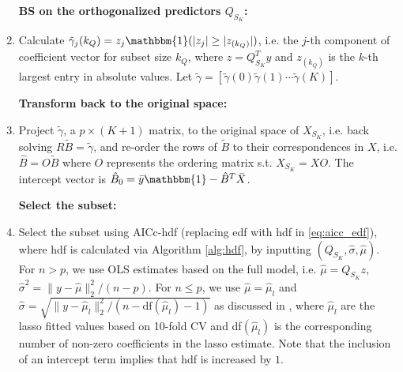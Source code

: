 \begin{algorithm}
\begin{enumerate}[label=\arabic*.]
		\textbf{BS on the orthogonalized predictors $Q_{S_{K}}$:}

		\item Calculate $\tilde{\gamma}_j (k_Q)= z_j \mathbbm{1}(|z_j| \ge |z_{(k_Q)}|)$, i.e. the $j$-th component of coefficient vector for subset size $k_Q$, where $z=Q_{S_{K}}^T y$ and $z_{(k_Q)}$ is the $k$-th largest entry in absolute values. Let $\tilde{\gamma} = [\tilde{\gamma} (0) \tilde{\gamma} (1) \cdots \tilde{\gamma} (K)]$.
		
		\textbf{Transform back to the original space:}

		\item Project $\tilde{\gamma}$, a $p \times (K+1)$ matrix, to the original space of $X_{S_{K}}$, i.e. back solving $R \tilde{B} = \tilde{\gamma}$, and re-order the rows of $\tilde{B}$ to their correspondences in $X$, i.e. $\hat{B} = O \tilde{B}$ where $O$ represents the ordering matrix s.t. $X_{S_{K}}=XO$. The intercept vector is $\hat{B}_0 = \bar{y} \mathbbm{1} - \hat{B}^T \bar{X}$. 

		\textbf{Select the subset:}

		\item Select the subset using AICc-hdf (replacing edf with hdf in \eqref{eq:aicc_edf}), where hdf is calculated via Algorithm \ref{alg:hdf}, by inputting $(Q_{S_{K}},\hat\sigma,\hat\mu)$. For $n > p$, we use OLS estimates based on the full model, i.e. $\hat{\mu}=Q_{S_{K}} z$, $\hat{\sigma}^2 = \lVert y-\hat{\mu} \rVert_2^2/(n-p)$. For $n \le p$, we use $\hat{\mu}=\hat{\mu}_l$ and $\hat{\sigma} = \sqrt{\lVert y-\hat{\mu}_l \rVert_2^2 / (n-\text{df}(\hat{\mu}_l)-1)}$ as discussed in \citet{reid2016study}, where $\hat{\mu}_l$ are the lasso fitted values based on 10-fold CV and df$(\hat{\mu}_l)$ is the corresponding number of non-zero coefficients in the lasso estimate. Note that the inclusion of an intercept term implies that hdf is increased by $1$. 
	\end{enumerate}
\end{algorithm}


